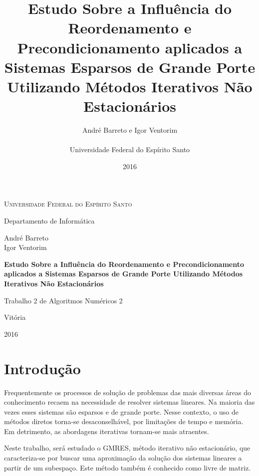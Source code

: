 \documentclass[
	11pt,				%
	oneside,			%
	a4paper,			%
	english,			%
	brazil,				%
	]{article}
\title{\textbf{Estudo Sobre a Influência do Reordenamento e Precondicionamento aplicados a Sistemas Esparsos de Grande Porte Utilizando Métodos Iterativos Não Estacionários}}
\author{
André Barreto e Igor Ventorim\\\\
\normalsize Universidade Federal do Espírito Santo\\
}
\date{2016}
\begin{document}


\frenchspacing

\graphicspath{ {Imagens/} }

\begin{titlepage}
	\centering
	{\scshape \large Universidade Federal do Espírito Santo\par}
	{\large Departamento de Informática\par}
	\vspace{1cm}
	{\large André Barreto\\Igor Ventorim\par}
	
	\vfill
	
	{\LARGE \bfseries Estudo Sobre a Influência do Reordenamento e Precondicionamento aplicados a Sistemas Esparsos de Grande Porte Utilizando Métodos Iterativos Não Estacionários\par}
	\vspace{1cm}
	{\large Trabalho 2 de Algoritmos Numéricos 2\par}

	\vfill

	{\large Vitória\par}
	{\large 2016\par}
\end{titlepage}
\addtocounter{page}{1}

\section{Introdução}
Frequentemente os processos de solução de problemas das mais diversas áreas do conhecimento recaem na necessidade de resolver sistemas lineares. Na maioria das vezes esses sistemas são esparsos e de grande porte. Nesse contexto, o uso de métodos diretos torna-se desaconselhável, por limitações de tempo e memória. Em detrimento, as abordagens iterativas tornam-se mais atraentes.

Neste trabalho, será estudado o GMRES, método iterativo não estacionário, que caracteriza-se por buscar uma aproximação da solução dos sistemas lineares a partir de um subespaço. Este método também é conhecido como livre de matriz.
\end{document}
